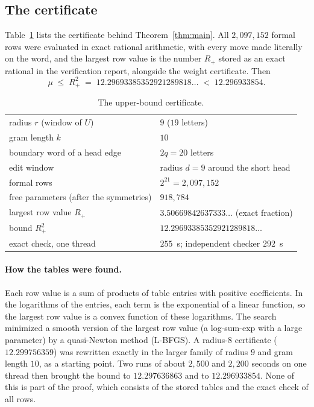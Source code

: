 \subsection{The certificate}

Table~\ref{tab:upper} lists the certificate behind Theorem~\ref{thm:main}. All $2{,}097{,}152$ formal rows were
evaluated in exact rational arithmetic, with every move made literally on the word, and the largest row value is the
number $R_+$ stored as an exact rational in the verification report, alongside the weight certificate. Then
\[ \mu\;\le\;R_+^2\;=\;12.29693385352921289818\ldots\;<\;12.296933854 . \]

\begin{table}[htb]
\centering
\begin{tabular}{ll}
\toprule
radius $r$ (window of $U$) & $9$ ($19$ letters) \\
gram length $k$ & $10$ \\
boundary word of a head edge & $2q=20$ letters \\
edit window & radius $d=9$ around the short head \\
formal rows & $2^{21}=2{,}097{,}152$ \\
free parameters (after the symmetries) & $918{,}784$ \\
largest row value $R_+$ & $3.50669842637333\ldots$ (exact fraction) \\
bound $R_+^2$ & $12.29693385352921289818\ldots$ \\
exact check, one thread & $255$~s; independent checker $292$~s \\
\bottomrule
\end{tabular}
\caption{The upper-bound certificate.}
\label{tab:upper}
\end{table}

\paragraph{How the tables were found.}
Each row value is a sum of products of table entries with positive coefficients. In the logarithms of the entries,
each term is the exponential of a linear function, so the largest row value is a convex function of these logarithms.
The search minimized a smooth version of the largest row value (a log-sum-exp with a large parameter) by a
quasi-Newton method (L-BFGS). A radius-$8$ certificate ($12.299756359$) was rewritten exactly in the larger family of
radius $9$ and gram length $10$, as a starting point. Two runs of about $2{,}500$ and $2{,}200$ seconds on one thread
then brought the bound to $12.297636863$ and to $12.296933854$. None of this is part of the proof, which consists of
the stored tables and the exact check of all rows.


